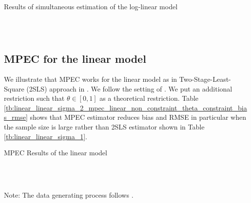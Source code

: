 \documentclass[11pt, a4paper]{article}
\begin{document}
\begin{table}[!htbp]
  \begin{center}
      \caption{Results of simultaneous estimation of the log-linear model}
      \label{tb:loglinear_loglinear_sigma_2_simultaneous_non_constraint_theta_constraint_bias_rmse} 
      \subfloat[$\sigma=0.5$]{}\\
      \subfloat[$\sigma=1.0$]{}\\
    \subfloat[$\sigma=2.0$]{}
  \end{center}
  \footnotesize
\end{table} 



\subsection{MPEC for the linear model}

We illustrate that MPEC works for the linear model as in Two-Stage-Least-Square (2SLS) approach in \cite{matsumura2023revisiting}. 
We follow the setting of \cite{matsumura2023revisiting}.
We put an additional restriction such that $\theta\in[0,1]$ as a theoretical restriction. 
Table \ref{tb:linear_linear_sigma_2_mpec_linear_non_constraint_theta_constraint_bias_rmse} shows that MPEC estimator reduces bias and RMSE in particular when the sample size is large rather than 2SLS estimator shown in Table \ref{tb:linear_linear_sigma_1}.

\begin{table}[!htbp]
  \begin{center}
      \caption{MPEC Results of the linear model}
      \label{tb:linear_linear_sigma_2_mpec_linear_non_constraint_theta_constraint_bias_rmse} 
      \subfloat[$\sigma=0.5$]{}\\
      \subfloat[$\sigma=1.0$]{}\\
    \subfloat[$\sigma=2.0$]{}
  \end{center}
  \footnotesize
  Note: The data generating process follows \cite{matsumura2023revisiting}.
\end{table} 
\end{document}
